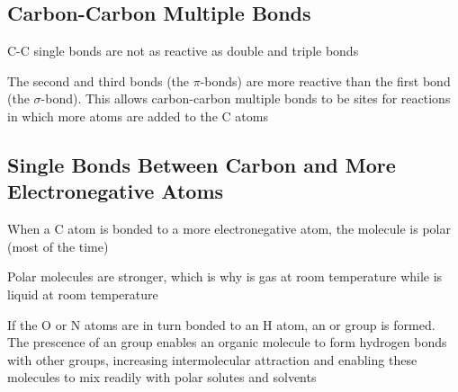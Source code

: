 \subsection{Carbon-Carbon Multiple Bonds}
\begin{bulleted-list}
    \item C-C single bonds are not as reactive as double and triple bonds
    \item The second and third bonds (the $\pi$-bonds) are more reactive than the first bond
        (the $\sigma$-bond). This allows carbon-carbon multiple bonds to be sites for reactions
        in which more atoms are added to the C atoms
\end{bulleted-list}

\subsection{Single Bonds Between Carbon and More Electronegative Atoms}
\begin{bulleted-list}
    \item When a C atom is bonded to a more electronegative atom, the molecule is polar (most of
        the time)
    \item Polar molecules are stronger, which is why  is gas at room temperature while
         is liquid at room temperature
    \item If the O or N atoms are in turn bonded to an H atom, an  or  group is
        formed. The prescence of an  group enables an organic molecule to form hydrogen 
        bonds with other  groups, increasing intermolecular attraction and enabling these
        molecules to mix readily with polar solutes and solvents
\end{bulleted-list}

